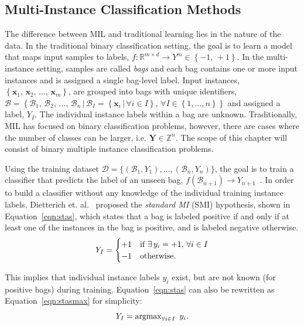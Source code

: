 \documentclass[reqno]{vcuthesis}
\newcommand{\set}[1]{{\left\{#1\right\}}}
\renewcommand{\st}{{\,|\,}}
\newcommand{\reals}{{\mathbb{R}}}
\newcommand{\ints}{{\mathbb Z}}
\numberwithin{equation}{chapter}
\begin{document}
\subsection{Multi-Instance Classification Methods}
The difference between MIL and traditional learning lies in the nature of the data. In the traditional binary classification setting, the goal is to learn a model that maps input samples to labels, $f: \reals^{m \times d} \rightarrow Y^m \in \set{-1,\,+1}$. In the multi-instance setting, samples are called \textit{bags} and each bag contains one or more input instances and is assigned a single bag-level label. Input instances, $\set{\bm x_1,\, \bm x_2,\, \ldots,\, \bm x_m}$, are grouped into bags with unique identifiers, $\mathcal{B} = \set{\mathcal{B}_1,\, \mathcal{B}_2,\, \ldots,\, \mathcal{B}_n \st \mathcal{B}_I = \set{\bm x_i \st \forall i \in I},\, \forall I \in \set{1, \ldots, n}}$ and assigned a label, $Y_I$. The individual instance labels within a bag are unknown. Traditionally, MIL has focused on binary classification problems, however, there are cases where the number of classes can be larger, i.e. $\bm Y \in \ints^n$. The scope of this chapter will consist of binary multiple instance classification problems. 

Using the training dataset $\mathcal{D} = \{(\mathcal{B}_1,Y_1), \ldots, (\mathcal{B}_n,Y_n)\}$, the goal is to train a classifier that predicts the label of an unseen bag, $f(\mathcal{B}_{n+1}) \rightarrow Y_{n+1}$~\cite{Amores2013}. In order to build a classifier without any knowledge of the individual training instance labels, Dietterich et. al.~\cite{Dietterich1997} proposed the \textit{standard MI} (SMI) hypothesis, shown in Equation~\eqref{eqn:stas}, which states that a bag is labeled positive if and only if at least one of the instances in the bag is positive, and is labeled negative otherwise.
\begin{equation}
\centering \label{eqn:stas}
 Y_I = \begin{cases}
			+1 & \text{if }\exists\, y_i = +1,\, \forall i \in I \\
			-1 & \text{otherwise}.
		  \end{cases}
\end{equation}

This implies that individual instance labels $y_i$ exist, but are not known (for positive bags) during training. Equation~\eqref{eqn:stas} can also be rewritten as Equation~\eqref{eqn:stasmax} for simplicity:
\begin{equation}
\centering \label{eqn:stasmax}
Y_I = \text{argmax}_{\forall i \in I}\,\,\, y_i.
\end{equation}
\end{document}
